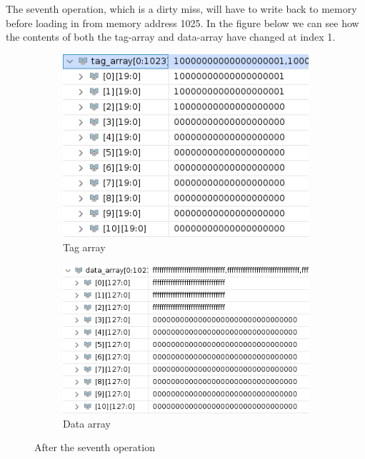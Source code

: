 \documentclass{article}
\begin{document}
The seventh operation, which is a dirty miss, will have to write back to memory before loading in from memory address 1025. In the figure below we can see how the contents of both the tag-array and data-array have changed at index 1.
\begin{figure}[H]
\centering
\begin{subfigure}{.5\textwidth}
  \centering
  \includegraphics[width=.8\linewidth]{img/tag5.png}
  \caption{Tag array}
\end{subfigure}%
\begin{subfigure}{.5\textwidth}
  \centering
  \includegraphics[width=.9\linewidth]{img/data5.png}
  \caption{Data array}
\end{subfigure}
\caption{After the seventh operation}
\end{figure}
\end{document}
